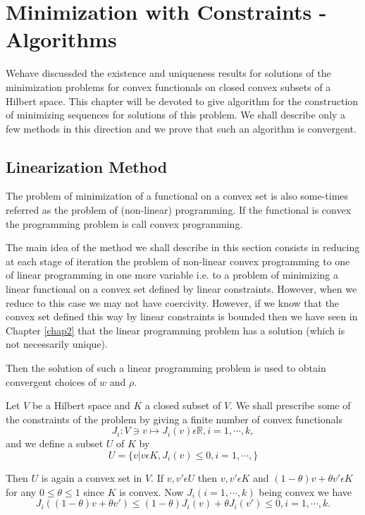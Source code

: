 
\chapter{Minimization with Constraints - Algorithms}\label{chap4}
We\pageoriginale have discussded the existence and uniqueness results for solutions of the minimization problems for convex functionals on closed convex subsets of a Hilbert space. This chapter will be devoted to give algorithm for the construction of minimizing sequences for solutions of this problem. We shall describe only a few methods in this direction and we prove that such an algorithm is convergent.

\section{Linearization Method}\label{chap4-sec1}
The problem of minimization of a functional on a convex set is also some-times referred as the problem of (non-linear) programming. If the functional is convex the programming problem is call convex programming.

The main idea of the method we shall describe in this section consists in reducing at each stage of iteration the problem of non-linear convex programming to one of linear programming in one more variable i.e. to a problem of minimizing a linear functional on a convex set defined by linear constraints. However, when we reduce to this case we may not have coercivity. However, if we know that the convex set defined this way by linear constraints is bounded then we have seen in Chapter \ref{chap2} that the linear programming problem has a solution (which is not necessarily unique).

Then the solution of such a linear programming problem is used to obtain convergent choices of $w$ and $\rho$.

Let $V$ be a Hilbert space and $K$ a closed subset of $V$. We shall prescribe some of the constraints of the problem by giving a finite number of convex functionals
$$
J_{i} : V \ni v \mapsto J_{i} (v) \epsilon \mathbb{R}, i = 1, \cdots, k,
$$\pageoriginale
and we define a subset $U$ of $K$ by
$$
U = \{v | v \epsilon K, J_{i} (v) \leq 0, i = 1, \cdots,\}
$$

Then $U$ is again a convex set in $V$. If $v, v' \epsilon U$ then $v, v' \epsilon K$ and $(1-\theta) v + \theta v' \epsilon K$ for any $0 \leq \theta \leq 1$ since $K$ is convex. Now $J_{i} (i = 1, \cdots, k)$ being convex we have
$$
J_{i} ((1-\theta)v + \theta v') \leq (1-\theta) J_{i}(v) + \theta J_{i} (v') \leq 0, i=1, \cdots, k.
$$ 

